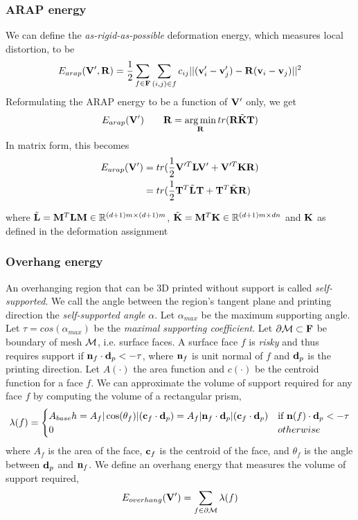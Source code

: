\subsubsection*{ARAP energy}

We can define the \textit{as-rigid-as-possible} deformation energy, which measures local distortion, to be
\[
    E_{arap}(\mathbf{V}', \mathbf{R}) = \frac{1}{2} \sum_{f\in \mathbf{F}} \sum_{(i,j)\in f} c_{ij} || (\mathbf{v}_i' - \mathbf{v}_j') - \mathbf{R}(\mathbf{v}_i - \mathbf{v}_j) ||^2
\]
Reformulating the ARAP energy to be a function of $\mathbf{V}'$ only, we get
\[
    E_{arap}(\mathbf{V}')
    \qquad
    \mathbf{R} = \operatorname*{arg\,min}_{\mathbf{R}} tr(\mathbf{R}\tilde{\mathbf{K}}\mathbf{T})
\]
In matrix form, this becomes
\begin{align*}
E_{arap}(\mathbf{V}') 
    &= tr(\frac{1}{2}\mathbf{V}'^T \mathbf{L} \mathbf{V}' + \mathbf{V}'^T \mathbf{K} \mathbf{R} ) \\
    &= tr(\frac{1}{2}\mathbf{T}^T \tilde{\mathbf{L}} \mathbf{T} + \mathbf{T}^T \tilde{\mathbf{K}} \mathbf{R})
\end{align*}
    
where $\tilde{\mathbf{L}} = \mathbf{M}^T \mathbf{L} \mathbf{M} \in \mathbb{R}^{(d+1)m \times (d+1)m}$, $\tilde{\mathbf{K}} = \mathbf{M}^T \mathbf{K} \in \mathbb{R}^{(d+1)m \times dn}$ and $\mathbf{K}$ as defined in the deformation assignment

\subsubsection*{Overhang energy}

An overhanging region that can be 3D printed without support is called \textit{self-supported}. We call the angle between the region's tangent plane and printing direction the \textit{self-supported angle} $\alpha$. Let $\alpha_{max}$ be the maximum supporting angle. Let $\tau = cos(\alpha_{max})$ be the \textit{maximal supporting coefficient}. Let $\partial \mathcal{M} \subset \mathbf{F}$ be boundary of mesh $\mathcal{M}$, i.e. surface faces. A surface face $f$ is \textit{risky} and thus requires support if $\mathbf{n}_f \cdot \mathbf{d}_{p} < -\tau$, where $\mathbf{n}_f$ is unit normal of $f$ and $\mathbf{d}_{p}$ is the printing direction. Let $A(\cdot)$ the area function and $c(\cdot)$ be the centroid function for a face $f$. We can approximate the volume of support required for any face $f$ by computing the volume of a rectangular prism,
\[
    \lambda(f) = 
    \begin{cases}
        A_{base} h = A_f |\cos(\theta_f)| (\mathbf{c}_f \cdot \mathbf{d}_{p}) = A_f |\mathbf{n}_f \cdot \mathbf{d}_{p}| (\mathbf{c}_f \cdot \mathbf{d}_{p}) & \text{if } \mathbf{n}(f) \cdot \mathbf{d}_{p} < -\tau \\
        0 & otherwise \\
    \end{cases}
\]
where $A_f$ is the area of the face, $\mathbf{c}_f$ is the centroid of the face, and $\theta_f$ is the angle between $\mathbf{d}_{p}$ and $\mathbf{n}_f$. We define an overhang energy that measures the volume of support required,
\[
    E_{overhang}(\mathbf{V}') = \sum_{f\in \partial \mathcal{M}} \lambda(f)
\]



